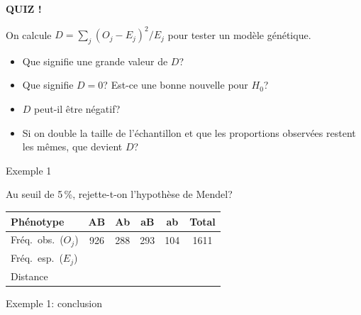 \documentclass{BeamerTemplate}
\begin{document}
\begin{frame}[plain,t]
  \centerline{\LARGE\bfseries\alert{QUIZ !}}

  \medskip
  On calcule $D=\sum_j (O_j-E_j)^2/E_j$ pour tester un modèle génétique.
  \begin{itemize}\itemsep 1.2cm
    \item Que signifie une \alert{grande} valeur de $D$?
    \item<2-> Que signifie $D=0$? Est-ce une bonne nouvelle pour $H_0$?
    \item<3-> $D$ peut-il être négatif?
    \item<4-> Si on double la taille de l'échantillon et que les proportions
    observées restent les mêmes, que devient $D$?
  \end{itemize}
\end{frame}

\begin{frame}[t]{Exemple 1}

Au seuil de 5\,\%, rejette-t-on l'hypothèse de Mendel?

\bigskip
\begin{center}
\renewcommand{\arraystretch}{1.6}
\begin{tabular}{l|cccc|c}
Phénotype & AB & Ab & aB & ab & Total\\
\hline
Fréq.\ obs.\ ($O_j$) & 926 & 288 & 293 & 104 & 1611\\
Fréq.\ esp.\ ($E_j$) & \hspace{1.2cm} & \hspace{1.2cm} & \hspace{1.2cm}
  & \hspace{1.2cm} & \\
Distance & & & & & \\
\end{tabular}
\end{center}

\end{frame}

\begin{frame}[t]{Exemple 1: conclusion}

\vspace{5cm}

\end{frame}
\end{document}
